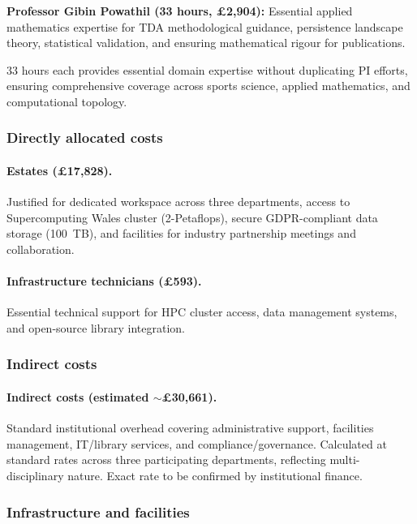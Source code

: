 \textbf{Professor Gibin Powathil (33 hours, \pounds2{,}904):} Essential applied mathematics expertise for TDA methodological guidance, persistence landscape theory, statistical validation, and ensuring mathematical rigour for publications.

33 hours each provides essential domain expertise without duplicating PI efforts, ensuring comprehensive coverage across sports science, applied mathematics, and computational topology.

\subsubsection{Directly allocated costs}

\paragraph{Estates (\pounds17{,}828).}
Justified for dedicated workspace across three departments, access to Supercomputing Wales cluster (2-Petaflops), secure GDPR-compliant data storage (100~TB), and facilities for industry partnership meetings and collaboration.

\paragraph{Infrastructure technicians (\pounds593).}
Essential technical support for HPC cluster access, data management systems, and open-source library integration.

\subsubsection{Indirect costs}

\paragraph{Indirect costs (estimated $\sim$\pounds30{,}661).}
Standard institutional overhead covering administrative support, facilities management, IT/library services, and compliance/governance. Calculated at standard rates across three participating departments, reflecting multi-disciplinary nature. Exact rate to be confirmed by institutional finance.

\subsubsection{Infrastructure and facilities}

